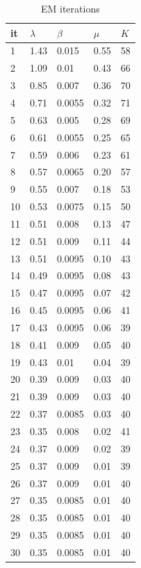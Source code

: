 \documentclass[10pt,a4paper]{article}
\begin{document}
\begin{table}[h!]
\centering
\caption{EM iterations}
\label{my-label}
\begin{tabular}{l|llll}
it & $\lambda$ & $\beta$ & $\mu$ & $K$ \\ \hline
1  & 1.43      & 0.015   & 0.55  & 58  \\
2  & 1.09      & 0.01    & 0.43  & 66  \\
3  & 0.85      & 0.007   & 0.36  & 70  \\
4  & 0.71      & 0.0055  & 0.32  & 71  \\
5  & 0.63      & 0.005   & 0.28  & 69  \\
6  & 0.61      & 0.0055  & 0.25  & 65  \\
7  & 0.59      & 0.006   & 0.23  & 61  \\
8  & 0.57      & 0.0065  & 0.20  & 57  \\
9  & 0.55      & 0.007   & 0.18  & 53  \\
10 & 0.53      & 0.0075  & 0.15  & 50  \\
11 & 0.51      & 0.008   & 0.13  & 47  \\
12 & 0.51      & 0.009   & 0.11  & 44  \\
13 & 0.51      & 0.0095  & 0.10  & 43  \\
14 & 0.49      & 0.0095  & 0.08  & 43  \\
15 & 0.47      & 0.0095  & 0.07  & 42  \\
16 & 0.45      & 0.0095  & 0.06  & 41  \\
17 & 0.43      & 0.0095  & 0.06  & 39  \\
18 & 0.41      & 0.009   & 0.05  & 40  \\
19 & 0.43      & 0.01    & 0.04  & 39  \\
20 & 0.39      & 0.009   & 0.03  & 40  \\
21 & 0.39      & 0.009   & 0.03  & 40  \\
22 & 0.37      & 0.0085  & 0.03  & 40  \\
23 & 0.35      & 0.008   & 0.02  & 41  \\
24 & 0.37      & 0.009   & 0.02  & 39  \\
25 & 0.37      & 0.009   & 0.01  & 39  \\
26 & 0.37      & 0.009   & 0.01  & 40  \\
27 & 0.35      & 0.0085  & 0.01  & 40  \\
28 & 0.35      & 0.0085  & 0.01  & 40  \\
29 & 0.35      & 0.0085  & 0.01  & 40  \\
30 & 0.35      & 0.0085  & 0.01  & 40 
\end{tabular}
\end{table}
\end{document}
